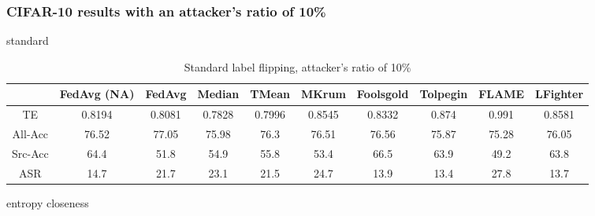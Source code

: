 \subsubsection{CIFAR-10 results with an attacker's ratio of 10\%}
standard
\begin{table}[h!]
        \centering
        \small
        \begin{adjustbox}{center}
        \begin{tabular}{|c|c|c|c|c|c|c|c|c|c|}
                \hline
                & FedAvg (NA) & FedAvg & Median & TMean & MKrum & Foolsgold & Tolpegin & FLAME & LFighter \\
                \hline
                TE & 0.8194 & 0.8081 & 0.7828 & 0.7996 & 0.8545 & 0.8332 & 0.874 & 0.991 & 0.8581 \\
                \hline
                All-Acc & 76.52 & 77.05 & 75.98 & 76.3 & 76.51 & 76.56 & 75.87 & 75.28 & 76.05 \\
                \hline
                Src-Acc & 64.4 & 51.8 & 54.9 & 55.8 & 53.4 & 66.5 & 63.9 & 49.2 & 63.8 \\
                \hline
                ASR & 14.7 & 21.7 & 23.1 & 21.5 & 24.7 & 13.9 & 13.4 & 27.8 & 13.7 \\
                \hline
        \end{tabular}
        \end{adjustbox}
        \caption{Standard label flipping, attacker's ratio of 10\%}
        \label{tab:standard_cifar_10}
    \end{table}
entropy
closeness

\newpage
